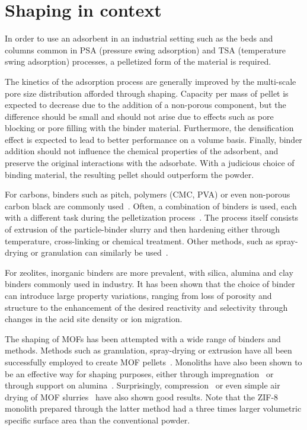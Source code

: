 
\section{Shaping in context}

In order to use an adsorbent in an industrial setting such as the beds and
columns common in PSA (pressure swing adsorption) and TSA (temperature swing adsorption)
processes, a pelletized form of the material is required.\cite{akhtarStructuringAdsorbentsCatalysts2014}

The kinetics of the adsorption process are generally improved by the multi-scale
pore size distribution afforded through shaping.
Capacity per mass of pellet is expected to decrease due to the
addition of a non-porous component, but the difference should be small and should not arise
due to effects such as pore blocking or pore filling with the binder material.
Furthermore, the densification effect is expected to lead to better performance on a volume basis.
Finally, binder addition should not influence the chemical properties of the adsorbent,
and preserve the original interactions with the adsorbate.
With a judicious choice of binding material, the resulting pellet
should outperform the powder.


For carbons, binders such as pitch, polymers (CMC, PVA) or even non-porous carbon black
are commonly used~\cite{ohjiAdvancedProcessingManufacturing2008}.
Often, a combination of binders is used, each with a different task during the
pelletization process~\cite{bandoszActivatedCarbonSurfaces2006}.
The process itself consists of extrusion of the
particle-binder slurry and then hardening either through temperature, cross-linking
or chemical treatment. Other methods, such as spray-drying or granulation can similarly
be used~\cite{ruthvenPrinciplesAdsorptionAdsorption1984}.

For zeolites, inorganic binders are more prevalent, with silica, alumina and clay binders
commonly used in industry. It has been shown
\cite{whitingcuriouscasezeolite2016, MichelsEffectsBindersPerformance2014}
that the choice of binder can introduce large property variations, ranging from
loss of porosity and structure to the enhancement of the desired reactivity and selectivity
through changes in the acid site density or ion migration.

The shaping of MOFs has been attempted with a wide range of binders and methods.
Methods such as granulation, spray-drying or extrusion have all
been successfully employed to create MOF
pellets~\cite{kaskelChemistryMetalorganicFrameworks2016}.
Monoliths have also been shown to be an effective way for shaping purposes,
either through impregnation~\cite{ramos-fernandezMOFsMeetMonoliths2011} or through
support on alumina~\cite{aguadoFacileShapingImidazolatebased2010}.
Surprisingly, compression~\cite{bazer-bachiIndustrialUseMetalorganic2014} or even
simple air drying of MOF slurries~\cite{tianMechanicallyChemicallyRobust2015}
have also shown good results. Note that the ZIF-8 monolith prepared through the
latter method had a three times larger volumetric specific surface area than
the conventional powder.

